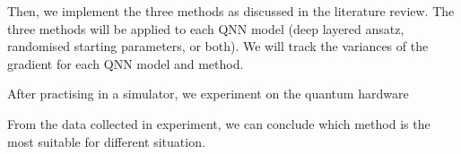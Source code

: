 
Then, we implement the three methods as discussed in the literature review.
The three methods will be applied to each QNN model (deep layered ansatz, randomised starting parameters, or both).
We will track the variances of the gradient for each QNN model and method.

After practising in a simulator, we experiment on the quantum hardware

From the data collected in experiment, we can conclude which method is the most suitable for different situation.

